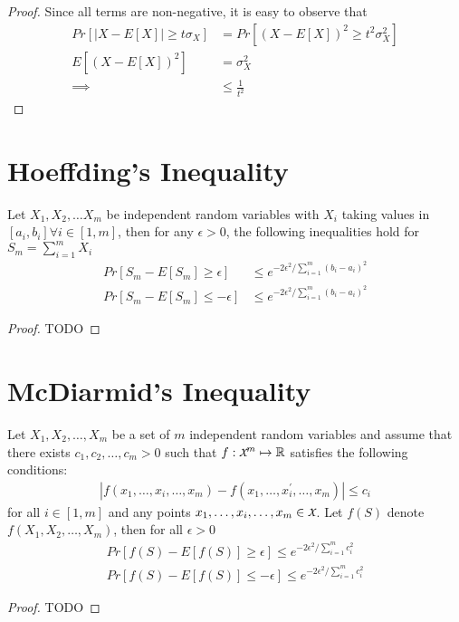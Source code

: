 \documentclass[../toml]{subfiles}
\begin{document}
\begin{proof}
Since all terms are non-negative, it is easy to observe that
\begin{align}
Pr\left[ |X-E[X]| \geq t\sigma_X \right] &= Pr\left[ \left(X-E[X]\right)^2 \geq t^2 \sigma_X^2 \right] \nonumber \\
E\left[ \left(X-E[X]\right)^2 \right] &= \sigma_X^2 \tag{by definition of Variance} \\
\implies &\leq \frac{1}{t^2} \tag{by Markov's Inequality}
\end{align}
\end{proof}

\section{Hoeffding's Inequality}
\begin{theorem} \label{th:hoeffding_inq}
Let $X_1, X_2, \ldots X_m$ be independent random variables with $X_i$ taking values
in $[a_i,b_i] \forall i \in [1,m]$, then for any $\epsilon > 0$, the following inequalities hold
for $S_m = \sum_{i=1}^{m} X_i$
\begin{align}
Pr[S_m - E[S_m] \geq \epsilon] &\leq e^{- 2\epsilon^2 / \sum_{i=1}^m (b_i - a_i)^2} \\
Pr[S_m - E[S_m] \leq -\epsilon] &\leq e^{- 2\epsilon^2 / \sum_{i=1}^m (b_i - a_i)^2}
\end{align}
\end{theorem}
\begin{proof}
TODO
\end{proof}

\section{McDiarmid's Inequality}
\begin{theorem} \label{th:mcdiarmids_inq}
Let $X_1, X_2, \ldots, X_m$ be a set of $m$ independent random variables and assume
that there exists $c_1,c_2,\ldots,c_m > 0$ such that $f: \cursive{X}^m \mapsto \mathbb{R}$
satisfies the following conditions:
\begin{align}
\left| f(x_1,\ldots,x_i,\ldots,x_m) - f(x_1,\ldots,x_i^\prime,\ldots,x_m) \right| \leq c_i
\end{align}
for all $i \in [1,m]$ and any points $x_1,\ldots,x_i,\ldots,x_m \in \cursive{X}$. Let $f(S)$
denote $f(X_1,X_2,\ldots,X_m)$, then for all $\epsilon > 0$
\begin{align}
Pr\left[ f(S) - E[f(S)] \geq \epsilon \right] \leq e^{-2\epsilon^2 / \sum_{i=1}^{m} c_i^2} \\
Pr\left[ f(S) - E[f(S)] \leq -\epsilon \right] \leq e^{-2\epsilon^2 / \sum_{i=1}^{m} c_i^2}
\end{align}
\end{theorem}
\begin{proof}
TODO
\end{proof}
\end{document}
